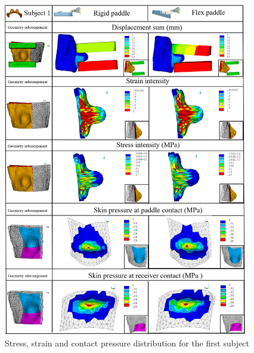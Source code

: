 \begin{figure}[h]
\centering
\includegraphics[width=0.95\textwidth,keepaspectratio]{figures/subject1_compressionResults.png} 
\caption{Stress, strain and contact pressure distribution for the first subject}\label{fig:subject1_compressionResults}
\end{figure}


